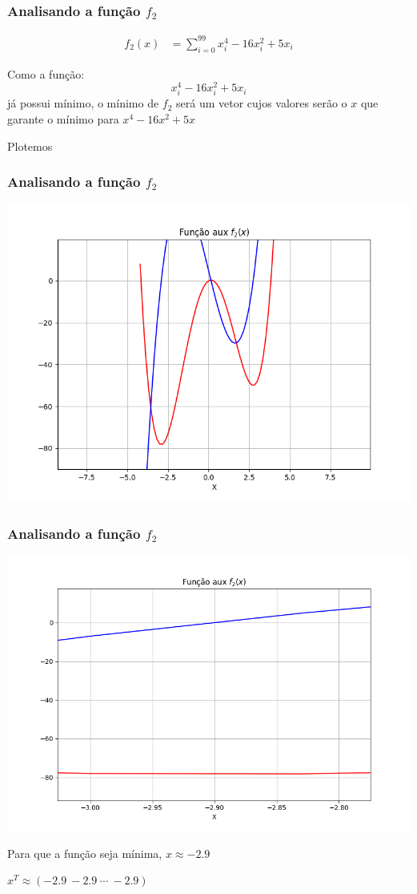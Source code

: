 \documentclass{beamer}
\newcommand{\ftwo}{\sum_{i=0}^{99} x_i^4 - 16 x_i^2 + 5 x_i}
\begin{document}
\begin{frame}
\frametitle{Analisando a função $f_2$}
\begin{align*}
	f_2(x) &= \ftwo
\end{align*} \pause

Como a função:
\[
	x_i^4 - 16 x_i^2 + 5 x_i
\]
já possui mínimo, o mínimo de $f_2$ será um vetor cujos valores
serão o $x$ que garante o mínimo para $x^4 - 16 x^2 + 5 x$ \pause

Plotemos
\end{frame}

\begin{frame}
\frametitle{Analisando a função $f_2$}

\begin{center}
	\includegraphics[scale=0.5]{fig1.png}
\end{center}
\end{frame}

\begin{frame}
\frametitle{Analisando a função $f_2$}

\begin{center}
	\includegraphics[scale=0.4]{fig2.png}
\end{center}

Para que a função seja mínima, $x \approx -2.9$ \pause

$x^T \approx (-2.9 \ -2.9 \ \cdots \ -2.9)$
\end{frame}
\end{document}

